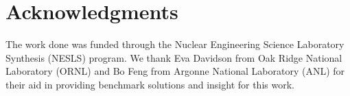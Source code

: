 \section{Acknowledgments}
The work done was funded through the Nuclear
Engineering Science Laboratory Synthesis (NESLS)
program. We thank Eva Davidson from Oak Ridge
National Laboratory (ORNL) and Bo Feng
from Argonne National Laboratory (ANL) for their
aid in providing benchmark solutions and insight
for this work.